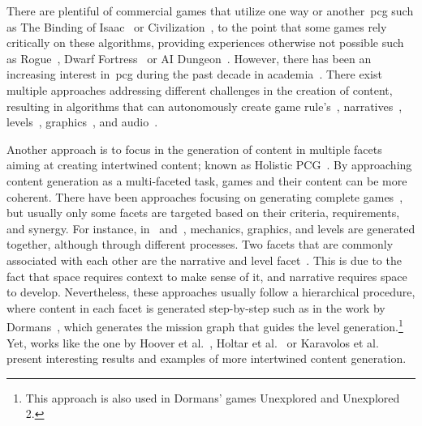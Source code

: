 There are plentiful of commercial games that utilize one way or another~\acrshort{pcg} such as The Binding of Isaac~\cite{bindingISAAC} or Civilization~\cite{civilization}, to the point that some games rely critically on these algorithms, providing experiences otherwise not possible such as Rogue~\cite{rogue}, Dwarf Fortress~\cite{dwarfFortress} or AI Dungeon~\cite{aidungeon}. However, there has been an increasing interest in~\acrshort{pcg} during the past decade in academia~\cite{liapis_10_2020}. There exist multiple approaches addressing different challenges in the creation of content, resulting in algorithms that can autonomously create game rule's~\cite{browne_evolutionary_2010,font_towards_2013}, narratives~\cite{ashmore_quest_2007,ammanabrolu_toward_2019}, levels~\cite{shaker_evolving_2012,sarkar_sequential_2020,green_mario_2020}, graphics~\cite{horsley_building_2017,pagnutti_you_2016}, and audio~\cite{scirea_metacompose_2016,hoover_functional_2014}. 

Another approach is to focus in the generation of content in multiple facets aiming at creating intertwined content; known as Holistic PCG~\cite{liapis_orchestrating_2019,salge_generative_2018}. By approaching content generation as a multi-faceted task, games and their content can be more coherent. There have been approaches focusing on generating complete games~\cite{browne_evolutionary_2010,guzdial_conceptual_2020,cook_angelina_2017}, but usually only some facets are targeted based on their criteria, requirements, and synergy. For instance, in~\cite{cook_rogue_2014} and~\cite{treanor_game-o-matic_2012}, mechanics, graphics, and levels are generated together, although through different processes. Two facets that are commonly associated with each other are the narrative and level facet~\cite{dormans_generating_2011,hartsook_toward_2011,ashmore_quest_2007,abuzuraiq_taksim_2019}. This is due to the fact that space requires context to make sense of it, and narrative requires space to develop. Nevertheless, these approaches usually follow a hierarchical procedure, where content in each facet is generated step-by-step such as in the work by Dormans~\cite{dormans_generating_2011}, which generates the mission graph that guides the level generation.\footnote{This approach is also used in Dormans' games Unexplored and Unexplored 2.} Yet, works like the one by Hoover et al.~\cite{hoover_audioinspace_2015}, Holtar et al.~\cite{holtar_audioverdrive_2013} or Karavolos et al.~\cite{karavolos_multi-faceted_2019} present interesting results and examples of more intertwined content generation.

